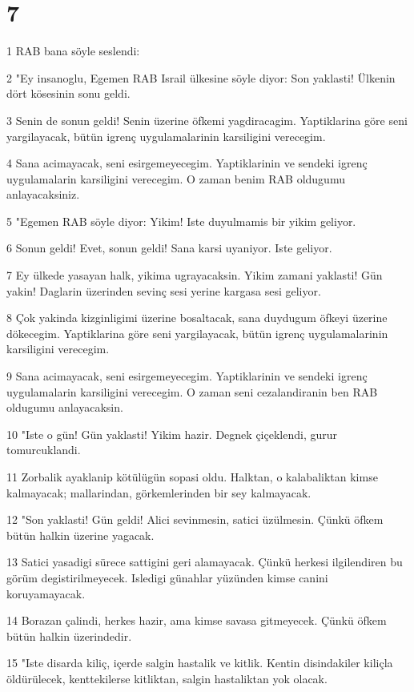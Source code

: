 \chapter{7}

\par 1 RAB bana söyle seslendi:
\par 2 "Ey insanoglu, Egemen RAB Israil ülkesine söyle diyor: Son yaklasti! Ülkenin dört kösesinin sonu geldi.
\par 3 Senin de sonun geldi! Senin üzerine öfkemi yagdiracagim. Yaptiklarina göre seni yargilayacak, bütün igrenç uygulamalarinin karsiligini verecegim.
\par 4 Sana acimayacak, seni esirgemeyecegim. Yaptiklarinin ve sendeki igrenç uygulamalarin karsiligini verecegim. O zaman benim RAB oldugumu anlayacaksiniz.
\par 5 "Egemen RAB söyle diyor: Yikim! Iste duyulmamis bir yikim geliyor.
\par 6 Sonun geldi! Evet, sonun geldi! Sana karsi uyaniyor. Iste geliyor.
\par 7 Ey ülkede yasayan halk, yikima ugrayacaksin. Yikim zamani yaklasti! Gün yakin! Daglarin üzerinden sevinç sesi yerine kargasa sesi geliyor.
\par 8 Çok yakinda kizginligimi üzerine bosaltacak, sana duydugum öfkeyi üzerine dökecegim. Yaptiklarina göre seni yargilayacak, bütün igrenç uygulamalarinin karsiligini verecegim.
\par 9 Sana acimayacak, seni esirgemeyecegim. Yaptiklarinin ve sendeki igrenç uygulamalarin karsiligini verecegim. O zaman seni cezalandiranin ben RAB oldugumu anlayacaksin.
\par 10 "Iste o gün! Gün yaklasti! Yikim hazir. Degnek çiçeklendi, gurur tomurcuklandi.
\par 11 Zorbalik ayaklanip kötülügün sopasi oldu. Halktan, o kalabaliktan kimse kalmayacak; mallarindan, görkemlerinden bir sey kalmayacak.
\par 12 "Son yaklasti! Gün geldi! Alici sevinmesin, satici üzülmesin. Çünkü öfkem bütün halkin üzerine yagacak.
\par 13 Satici yasadigi sürece sattigini geri alamayacak. Çünkü herkesi ilgilendiren bu görüm degistirilmeyecek. Isledigi günahlar yüzünden kimse canini koruyamayacak.
\par 14 Borazan çalindi, herkes hazir, ama kimse savasa gitmeyecek. Çünkü öfkem bütün halkin üzerindedir.
\par 15 "Iste disarda kiliç, içerde salgin hastalik ve kitlik. Kentin disindakiler kiliçla öldürülecek, kenttekilerse kitliktan, salgin hastaliktan yok olacak.
